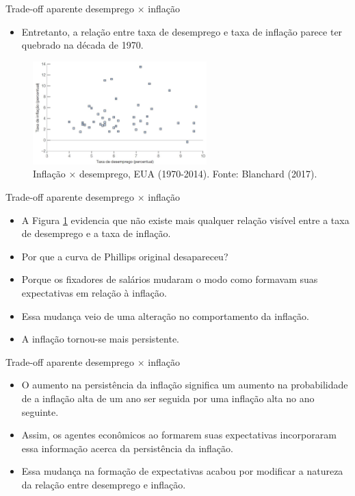 \documentclass[10pt]{beamer}
\begin{document}
\begin{frame}{Trade-off aparente desemprego $\times$ inflação}
    \begin{itemize}
        \item Entretanto, a relação entre taxa de desemprego e taxa de inflação parece ter quebrado na década de 1970.
    \end{itemize}
    \begin{figure}
        \centering
        \includegraphics[width=0.6\textwidth]{./figures/aula13_fig8.JPG}
        \caption{Inflação $\times$ desemprego, EUA (1970-2014). Fonte: Blanchard (2017).}
        \label{fig8}
    \end{figure}
\end{frame}

\begin{frame}{Trade-off aparente desemprego $\times$ inflação}
    \begin{itemize}
        \item A Figura \ref{fig8} evidencia que não existe mais qualquer relação visível entre a taxa de desemprego e a taxa de inflação.
        \bigskip
        \item Por que a curva de Phillips original desapareceu?
        \bigskip
        \item Porque os fixadores de salários mudaram o modo como formavam suas expectativas em relação à inflação.
        \bigskip
        \item Essa mudança veio de uma alteração no comportamento da inflação.
        \bigskip
        \item A inflação tornou-se mais persistente.
    \end{itemize}
\end{frame}

\begin{frame}{Trade-off aparente desemprego $\times$ inflação}
    \begin{itemize}
        \item O aumento na persistência da inflação significa um aumento na probabilidade de a inflação alta de um ano ser seguida por uma inflação alta no ano seguinte.
        \bigskip
        \item Assim, os agentes econômicos ao formarem suas expectativas incorporaram essa informação acerca da persistência da inflação.
        \bigskip
        \item Essa mudança na formação de expectativas acabou por modificar a natureza da relação entre desemprego e inflação.
    \end{itemize}
\end{frame}
\end{document}
